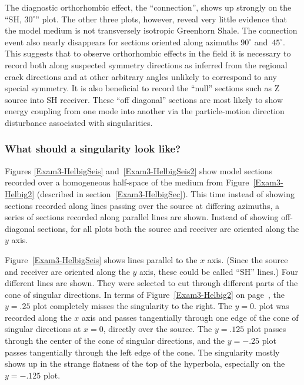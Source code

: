 The diagnostic orthorhombic effect, the ``connection'', shows up strongly
on the ``SH, $30^\circ$'' plot. The other three plots, however,
reveal very little evidence
that the model medium is not transversely isotropic Greenhorn Shale.
The connection event also nearly disappears for sections oriented
along azimuths $90^\circ$ and~$45^\circ$.
This suggests that to observe orthorhombic effects in the field
it is necessary to record both along suspected symmetry directions
as inferred from the regional crack directions
and at other arbitrary angles unlikely to correspond to any special symmetry.
It is also beneficial to record the ``null'' sections such as Z source into
SH receiver.
These ``off diagonal'' sections are most likely to show energy
coupling from one mode into another via the particle-motion direction
disturbance associated with singularities.

\subsubsection{What should a singularity look like?}
Figures \ref{Exam3-HelbigSeis} and~\ref{Exam3-HelbigSeis2}
show model sections recorded over
a homogeneous half-space of the medium from
Figure~\ref{Exam3-Helbig2}
(described in section~\ref{Exam3-HelbigSec}).
This time instead of showing sections
recorded along lines passing over the source at differing azimuths,
a series of sections recorded along parallel lines are shown.
Instead of showing off-diagonal sections,
for all plots both the source and receiver are oriented along the
$y$ axis.

Figure~\ref{Exam3-HelbigSeis} shows lines parallel to the $x$ axis.
(Since the source and receiver are oriented along the $y$ axis,
these could be called ``SH'' lines.)
Four different lines are shown. They were selected to cut through
different parts of the cone of singular directions.
In terms of Figure~\ref{Exam3-Helbig2} on page~\pageref{Exam3-Helbig2},
the $y=.25$ plot completely misses the singularity to the right.
The $y=0.$ plot was recorded along the $x$ axis and passes tangentially
through one edge of the cone of singular directions at $x=0$, directly
over the source.
The $y=.125$ plot passes through the center of the cone of singular
directions, and the $y=-.25$ plot passes tangentially through the
left edge of the cone.
The singularity mostly shows up in the strange flatness of the top
of the hyperbola, especially on the $y=-.125$ plot.

